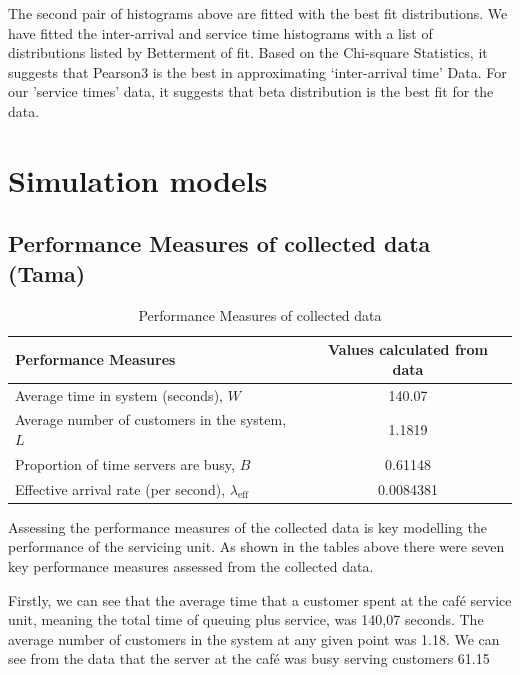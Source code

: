 \documentclass{article}
\begin{document}
The second pair of histograms above are fitted with the best fit distributions. We have fitted the inter-arrival and service time histograms with a list of distributions listed by Betterment of fit. Based on the Chi-square Statistics, it suggests that Pearson3 is the best in approximating ‘inter-arrival time’ Data. For our 'service times' data, it suggests that beta distribution is the best fit for the data.

\section{Simulation models}

\subsection{Performance Measures of collected data (Tama)}

\begin{table}[H]
    \centering
    \caption{Performance Measures of collected data}
    \begin{tabu}{X S}
        \toprule
        \textbf{Performance Measures} & \textbf{Values calculated from data}\\
        \midrule
        Average time in system (seconds), $W$   & 140.07 \\
        Average number of customers in the system, $L$ & 1.1819\\
        Proportion of time servers are busy, $B$ & 0.61148  \\
        Effective arrival rate (per second), $\lambda_{\text{eff}}$ & 0.0084381\\
        \bottomrule
    \end{tabu}
    \label{tab:Original Data PF}
\end{table}

Assessing the performance measures of the collected data is key modelling the performance of the servicing unit. As shown in the tables above there were seven key performance measures assessed from the collected data. 

Firstly, we can see that the average time that a customer spent at the café service unit, meaning the total time of queuing plus service, was 140,07 seconds. The average number of customers in the system at any given point was 1.18. We can see from the data that the server at the café was busy serving customers 61.15%
\end{document}
